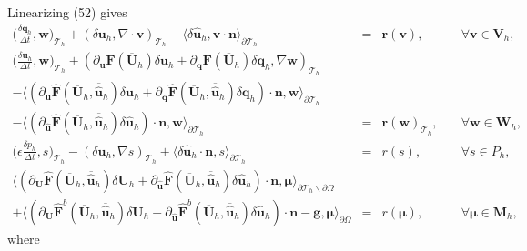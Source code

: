 \documentclass[11pt]{article}
\begin{document}
Linearizing (52) gives
\begin{equation}
\begin{array}{rcll}
\displaystyle \Big(\frac{\delta \bm{q}_h}{\Delta t}, \bm{w} \Big)_{\mathcal{T}_h} + (\delta \bm{u}_h, \nabla \cdot \bm{v})_{\mathcal{T}_h} - \langle \delta \widehat{\bm{u}}_h, \bm{v} \cdot \bm{n} \rangle_{\partial \mathcal{T}_h}  & = & \bm{r}(\bm{v}), & \quad \forall \bm{v} \in \bm{V}_h, \\[2ex] 
\displaystyle \Big(\frac{\delta \bm{u}_h}{\Delta t}, \bm{w} \Big)_{\mathcal{T}_h} + (\partial_{\bm{u}} \bm{F} (\overline{\bm{U}}_h) \delta \bm{u}_h + \partial_{\bm{q}} \bm{F} (\overline{\bm{U}}_h) \delta \bm{q}_h, \nabla \bm{w})_{\mathcal{T}_h} & & \\[2ex]
- \langle (\partial_{\bm{u}} \widehat{\bm{F}} (\overline{\bm{U}}_h,\overline{\widehat{\bm{u}}}_h) \delta \bm{u}_h + \partial_{{\bm{q}}} \widehat{\bm{F}} (\overline{\bm{U}}_h,\overline{\widehat{\bm{u}}}_h) \delta {\bm{q}}_h) \cdot \bm{n}, \bm{w} \rangle_{\partial \mathcal{T}_h} & & \\[2ex]
 - \langle (\partial_{\widehat{\bm{u}}} \widehat{\bm{F}} (\overline{\bm{U}}_h,  \overline{\widehat{\bm{u}}}_h) \delta \widehat{\bm{u}}_h) \cdot \bm{n}, \bm{w} \rangle_{\partial \mathcal{T}_h}   & = &  \bm{r}(\bm{w})_{\mathcal{T}_h},  & \quad \forall \bm{w} \in \bm{W}_h, \\[2ex]
\displaystyle \Big(\epsilon \frac{\delta p_h}{\Delta t}, s\Big)_{\mathcal{T}_h} - (\delta \bm{u}_h, \nabla s)_{\mathcal{T}_h} + \langle \delta \widehat{\bm{u}}_h \cdot \bm{n},s \rangle_{\partial \mathcal{T}_h}  & = & r(s), & \quad \forall s \in P_h, \\[2ex]
 \langle (\partial_{\bm{U}} \widehat{\bm{F}} (\overline{\bm{U}}_h, \overline{\widehat{\bm{u}}}_h) \delta\bm{U}_h + \partial_{\widehat{\bm{u}}} \widehat{\bm{F}} (\overline{\bm{U}}_h, \overline{\widehat{\bm{u}}}_h) \delta \widehat{\bm{u}}_h ) \cdot \bm{n}, \bm{\mu} \rangle_{\partial \mathcal{T}_h \backslash \partial \Omega} & & \\[2ex]
  + \langle (\partial_{\bm{U}} \widehat{\bm{F}}^b (\overline{\bm{U}}_h, \overline{\widehat{\bm{u}}}_h) \delta\bm{U}_h + \partial_{\widehat{\bm{u}}} \widehat{\bm{F}}^b (\overline{\bm{U}}_h, \overline{\widehat{\bm{u}}}_h) \delta \widehat{\bm{u}}_h ) \cdot \bm{n}  - \bm{g}, \bm{\mu} \rangle_{\partial \Omega}  & = & r(\bm{\mu}), & \quad \forall \bm{\mu} \in \bm{M}_h ,
\end{array}
\end{equation}
where
\end{document}
